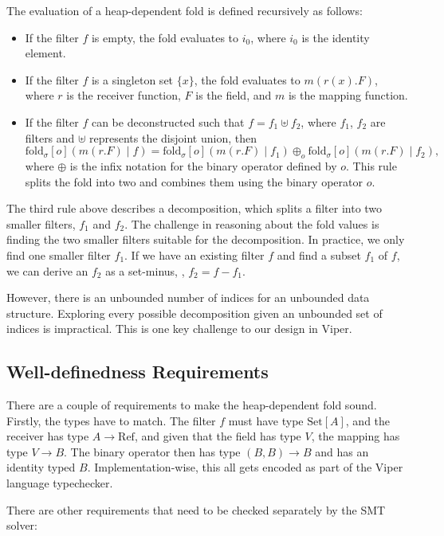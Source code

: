 \documentclass[msc,oneside]{ubcthesis}
\begin{document}
The evaluation of a heap-dependent fold is defined recursively as follows:
\begin{itemize}
    \item If the filter $f$ is empty, the fold evaluates to $i_0$, where $i_0$ is the identity element.
    \item If the filter $f$ is a singleton set $\{x\}$, the fold evaluates to $m(r(x).F)$, where $r$ is the receiver function, $F$ is the field, and $m$ is the mapping function.
    \item If the filter $f$ can be deconstructed such that $f = f_1 \uplus f_2$, where $f_1$, $f_2$ are filters and $\uplus$ represents the disjoint union, then  $$\textrm{fold}_{\sigma}[o]( m(r.F) \mid f)  = \textrm{fold}_{\sigma}[o]( m(r.F) \mid f_1)  \oplus_o \textrm{fold}_{\sigma}[o]( m(r.F) \mid f_2),$$ where $\oplus$ is the infix notation for the binary operator defined by $o$. This rule splits the fold into two and combines them using the binary operator $o$.
\end{itemize}

The third rule above describes a decomposition, which splits a filter into two smaller filters, $f_1$ and $f_2$. The challenge in reasoning about the fold values is finding the two smaller filters suitable for the decomposition. In practice, we only find one smaller filter $f_1$. If we have an existing filter $f$ and find a subset $f_1$ of $f$, we can derive an $f_2$ as a set-minus, \ie, $f_2 = f - f_1$. 

However, there is an unbounded number of indices for an unbounded data structure. Exploring every possible decomposition given an unbounded set of indices is impractical. This is one key challenge to our design in Viper.

\subsection{Well-definedness Requirements}
There are a couple of requirements to make the heap-dependent fold sound. Firstly, the types have to match. The filter $f$ must have type $\textrm{Set}[A]$, and the receiver has type $A \rightarrow \textrm{Ref}$, and given that the field has type $V$, the mapping has type $V \rightarrow B$. The binary operator then has type $(B, B) \rightarrow B$ and has an identity typed $B$. Implementation-wise, this all gets encoded as part of the Viper language typechecker. 

There are other requirements that need to be checked separately by the SMT solver:
\end{document}
